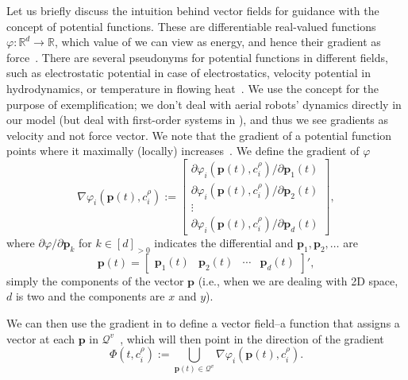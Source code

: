 Let us briefly discuss the intuition behind vector fields for guidance with the concept of potential functions. These are differentiable real-valued functions $\varphi:\mathbb{R}^d\rightarrow\mathbb{R}$, which value of we can view as energy, and hence their gradient as force~\citep{choset2005principles}. There are several pseudonyms for potential functions in different fields, such as electrostatic potential in case of electrostatics, velocity potential in hydrodynamics, or temperature in flowing heat~\citep{needham1998visual}. We use the concept for the purpose of exemplification; we don't deal with aerial robots' dynamics directly in our model (but deal with first-order systems in ), and thus we see gradients as velocity and not force vector. We note that the gradient of a potential function points where it maximally (locally) increases~\citep{choset2005principles}. We define the gradient of $\varphi$
\begin{equation}\label{eq:grady}
  \nabla\varphi_i(\mathbf{p}(t),c^\rho_i):=\begin{bmatrix}\partial\varphi_i(\mathbf{p}(t),c^\rho_i)/\partial\mathbf{p}_1(t)\\\partial\varphi_i(\mathbf{p}(t),c^\rho_i)/\partial\mathbf{p}_2(t)\\\vdots\\\partial\varphi_i(\mathbf{p}(t),c^\rho_i)/\partial\mathbf{p}_d(t)\end{bmatrix},
\end{equation}
where $\partial\varphi/\partial\mathbf{p}_k$ for $k\in[d]_{>0}$ indicates the differential and $\mathbf{p}_1,\mathbf{p}_2,\dots$ are 
\begin{equation}
  \mathbf{p}(t)=\begin{bmatrix}
    \mathbf{p}_1(t) & \mathbf{p}_2(t) & \cdots & \mathbf{p}_d(t)
  \end{bmatrix}',
\end{equation}
simply the components of the vector $\mathbf{p}$ (i.e., when we are dealing with 2D space, $d$ is two and the components are $x$ and $y$). 

We can then use the gradient in  to define a vector field--a function that assigns a vector at each $\mathbf{p}$ in $\mathcal{Q}^v$~\citep{lavalle2006planning,choset2005principles}, which will then point in the direction of the gradient
\begin{equation}\label{eq:vec-field-def}
  \varPhi(t,c_i^\rho):=\bigcup\limits_{\mathbf{p}(t)\in\mathcal{Q}^v}{\nabla\varphi_i(\mathbf{p}(t),c_i^\rho)}.
\end{equation}

